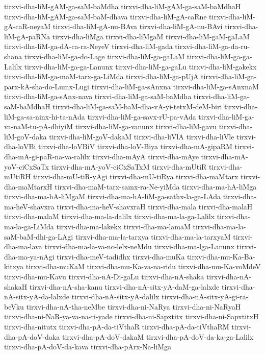 {tirxvi-dha-liM-gAM-ga-saM-baMdha
tirxvi-dha-liM-gAM-ga-saM-baMdhaH
tirxvi-dha-liM-gAM-ga-saM-baM-dhava
tirxvi-dha-liM-gA-caRne
tirxvi-dha-liM-gA-caR-neyaM
tirxvi-dha-liM-gA-nu-BAva
tirxvi-dha-liM-gA-nu-BAvi
tirxvi-dha-liM-gA-paRNa
tirxvi-dha-liMga
tirxvi-dha-liMgaM
tirxvi-dha-liM-gaM-gaLaM
tirxvi-dha-liM-ga-dA-ca-ra-NeyeV
tirxvi-dha-liM-gada
tirxvi-dha-liM-ga-da-ru-shana
tirxvi-dha-liM-ga-do-Lage
tirxvi-dha-liM-ga-gaLaM
tirxvi-dha-liM-ga-ga-Lalilx
tirxvi-dha-liM-ga-ga-Lanunx
tirxvi-dha-liM-ga-gaLu
tirxvi-dha-liM-gakekx
tirxvi-dha-liM-ga-maM-tarx-ga-LiMda
tirxvi-dha-liM-ga-pUjA
tirxvi-dha-liM-ga-parx-kA-sha-do-Lumx-Lugi
tirxvi-dha-liM-ga-sAnxna
tirxvi-dha-liM-ga-sAnxnaM
tirxvi-dha-liM-ga-sAnx-nava
tirxvi-dha-liM-ga-saM-baMdha
tirxvi-dha-liM-ga-saM-baMdhaH
tirxvi-dha-liM-ga-saM-baM-dha-vA-yi-tetxM-deM-biri
tirxvi-dha-liM-ga-sa-ninx-hi-ta-nAda
tirxvi-dha-liM-ga-savx-rU-pa-vAda
tirxvi-dha-liM-ga-va-naM-tu-pA-dhiyiM
tirxvi-dha-liM-ga-vanunx
tirxvi-dha-liM-gavu
tirxvi-dha-liM-goV-daka
tirxvi-dha-liM-goV-dakaM
tirxvi-dha-liVlA
tirxvi-dha-liVle
tirxvi-dha-loVBi
tirxvi-dha-loVBiV
tirxvi-dha-loV-Biya
tirxvi-dha-mA-gipaRM
tirxvi-dha-mA-gi-paR-na-va-ralilx
tirxvi-dha-mAyA
tirxvi-dha-mAye
tirxvi-dha-mA-yoV-ciCxSaTx
tirxvi-dha-mA-yoV-ciCxSaTxM
tirxvi-dha-mUtiR
tirxvi-dha-mUtiRH
tirxvi-dha-mU-tiR-yAgi
tirxvi-dha-mU-tiRya
tirxvi-dha-maMtarx
tirxvi-dha-maMtarxH
tirxvi-dha-maM-tarx-samx-ra-Ne-yiMda
tirxvi-dha-ma-hA-liMga
tirxvi-dha-ma-hA-liMgaM
tirxvi-dha-ma-hA-liM-ga-sathx-la-ga-LAda
tirxvi-dha-ma-heV-shavxra
tirxvi-dha-ma-heV-shavxraH
tirxvi-dha-mala
tirxvi-dha-malaH
tirxvi-dha-malaM
tirxvi-dha-ma-la-dalilx
tirxvi-dha-ma-la-ga-Lalilx
tirxvi-dha-ma-la-ga-LiMda
tirxvi-dha-ma-lakekx
tirxvi-dha-ma-lamaM
tirxvi-dha-ma-la-saM-baM-dhi-ga-LAgi
tirxvi-dha-ma-la-tarxya
tirxvi-dha-ma-la-tarxyaM
tirxvi-dha-ma-lava
tirxvi-dha-ma-la-va-no-lelx-neMdu
tirxvi-dha-ma-lga-Lanunx
tirxvi-dha-ma-ya-nAgi
tirxvi-dha-meV-tadidhx
tirxvi-dha-muKa
tirxvi-dha-mu-Ka-Ba-kitxya
tirxvi-dha-muKaM
tirxvi-dha-mu-Ka-va-na-ridu
tirxvi-dha-mu-Ka-voMdeV
tirxvi-dha-mu-Kavu
tirxvi-dha-nA-Di-gaLu
tirxvi-dha-nA-shaka
tirxvi-dha-nA-shakaH
tirxvi-dha-nA-sha-kanu
tirxvi-dha-nA-sitx-yA-daM-ga-lalxde
tirxvi-dha-nA-sitx-yA-da-lalxde
tirxvi-dha-nA-sitx-yA-dalilx
tirxvi-dha-nA-sitx-yA-gi-ra-beVku
tirxvi-dha-nA-tha-neMbe
tirxvi-dha-ni-NaRya
tirxvi-dha-ni-NaRyaH
tirxvi-dha-ni-NaR-ya-va-na-ri-yade
tirxvi-dha-ni-Sapxtitx
tirxvi-dha-ni-SapxtitxH
tirxvi-dha-nitutx
tirxvi-dha-pA-da-tiVthaR
tirxvi-dha-pA-da-tiVthaRM
tirxvi-dha-pA-doV-daka
tirxvi-dha-pA-doV-dakaM
tirxvi-dha-pA-doV-da-ka-ga-Lalilx
tirxvi-dha-pA-doV-da-kava
tirxvi-dha-pArx-Na-liMga
}
